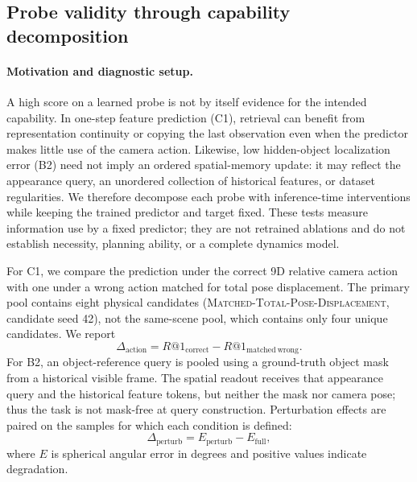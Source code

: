 
\subsection{Probe validity through capability decomposition}
\label{sec:probe-validity}

\paragraph{Motivation and diagnostic setup.}
A high score on a learned probe is not by itself evidence for the intended
capability.  In one-step feature prediction (C1), retrieval can benefit from
representation continuity or copying the last observation even when the
predictor makes little use of the camera action.  Likewise, low hidden-object
localization error (B2) need not imply an ordered spatial-memory update: it may
reflect the appearance query, an unordered collection of historical features,
or dataset regularities.  We therefore decompose each probe with
inference-time interventions while keeping the trained predictor and target
fixed.  These tests measure information use by a fixed predictor; they are not
retrained ablations and do not establish necessity, planning ability, or a
complete dynamics model.

For C1, we compare the prediction under the correct 9D relative camera action
with one under a wrong action matched for total pose displacement.  The primary
pool contains eight physical candidates
(\textsc{Matched-Total-Pose-Displacement}, candidate seed 42), not the
same-scene pool, which contains only four unique candidates.  We report
\begin{equation}
  \Delta_{\mathrm{action}}
  = R@1_{\mathrm{correct}}-R@1_{\mathrm{matched\ wrong}}.
\end{equation}
For B2, an object-reference query is pooled using a ground-truth object mask
from a historical visible frame.  The spatial readout receives that appearance
query and the historical feature tokens, but neither the mask nor camera pose;
thus the task is not mask-free at query construction.  Perturbation effects are
paired on the samples for which each condition is defined:
\begin{equation}
  \Delta_{\mathrm{perturb}}=E_{\mathrm{perturb}}-E_{\mathrm{full}},
\end{equation}
where $E$ is spherical angular error in degrees and positive values indicate
degradation.

